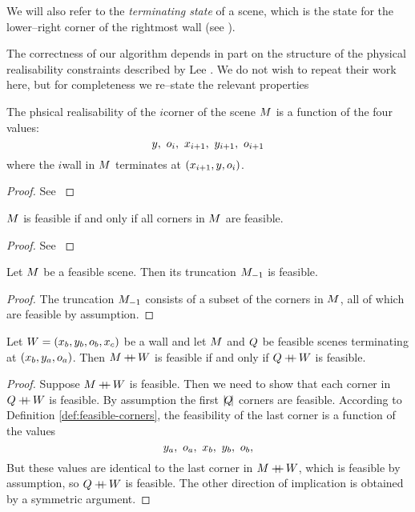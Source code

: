 We will also refer to the \textit{terminating state} of a scene, which
is the state for the lower--right corner of the rightmost wall (see
).

The correctness of our algorithm depends in part on the structure of
the physical realisability constraints described by Lee \etal
\cite{Lee09}. We do not wish to repeat their work here, but for
completeness we re--state the relevant properties

\begin{lemma}
  \label{def:feasible-corners}
  The phsical realisability of the $i$\th corner of the scene $\Scene$
  is a function of the four values:
  \begin{equation}
    y,~\WallOrient_i,~x_{i+1},~y_{i+1},~\WallOrient_{i+1}
  \end{equation}
  where the $i$\th wall in $\Scene$ terminates at
  $(x_{i+1},y,\WallOrient_i)$.
\end{lemma}
\begin{proof}
  See \cite{Lee09}
\end{proof}

\begin{lemma}
  \label{def:feasible-scenes}
  $\Scene$ is feasible if and only if all corners in $\Scene$ are feasible.
\end{lemma}
\begin{proof}
  See \cite{Lee09}
\end{proof}

\begin{lemma}
  \label{lemma:trunc-feasibility}
  Let $\Scene$ be a feasible scene. Then its truncation $\Scene_{-1}$ is
  feasible.
\end{lemma}
\begin{proof}
  The truncation $\Scene_{-1}$ consists of a subset of the corners in
  $\Scene$, all of which are feasible by assumption.
\end{proof}

\begin{lemma}
  \label{lemma:concat-feasibility}
  Let $\Wall=(x_b,y_b,\WallOrient_b,x_c)$ be a wall and let $\Scene$ and
  $\OtherScene$ be feasible scenes terminating at
  $(x_b,y_a,\WallOrient_a)$. Then $\Scene\concat\Wall$ is feasible if
  and only if $\OtherScene\concat\Wall$ is feasible.
\end{lemma}
\begin{proof}
  Suppose $\Scene\concat\Wall$ is feasible. Then we need to show that
  each corner in $\OtherScene\concat\Wall$ is feasible. By assumption
  the first $\Length{\OtherScene}$ corners are feasible. According to
  Definition \ref{def:feasible-corners}, the feasibility of the last corner
  is a function of the values
  \begin{equation}
    y_a,~\WallOrient_a,~x_b,~y_b,~\WallOrient_b,
  \end{equation}
  But these values are identical to the last corner in
  $\Scene\concat\Wall$, which is feasible by assumption, so
  $\OtherScene\concat\Wall$ is feasible. The other
  direction of implication is obtained by a symmetric argument.
\end{proof}

